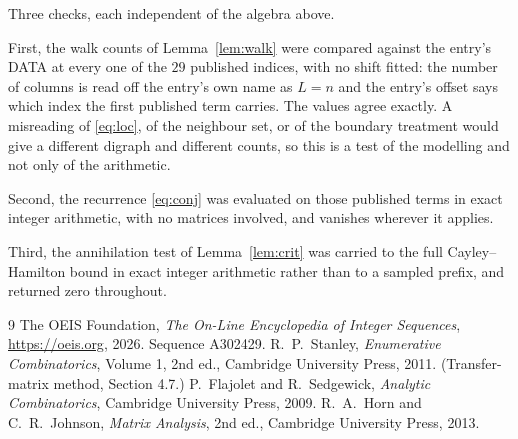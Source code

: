 \documentclass[11pt,a4paper]{article}
\theoremstyle{plain}
\theoremstyle{definition}
\begin{document}
Three checks, each independent of the algebra above.

First, the walk counts of Lemma~\ref{lem:walk} were compared against the entry's DATA at
every one of the $29$ published indices, with no shift fitted: the number of columns is
read off the entry's own name as $L=n$ and the entry's offset says which index the first
published term carries. The values agree exactly. A misreading of \eqref{eq:loc}, of the
neighbour set, or of the boundary treatment would give a different digraph and different
counts, so this is a test of the modelling and not only of the arithmetic.

Second, the recurrence \eqref{eq:conj} was evaluated on those published terms in exact
integer arithmetic, with no matrices involved, and vanishes wherever it applies.

Third, the annihilation test of Lemma~\ref{lem:crit} was carried to the full
Cayley--Hamilton bound in exact integer arithmetic rather than to a sampled prefix, and
returned zero throughout.

\begin{thebibliography}{9}
 The OEIS Foundation, \emph{The On-Line Encyclopedia of Integer
Sequences}, \url{https://oeis.org}, 2026. Sequence A302429.
 R.~P.~Stanley, \emph{Enumerative Combinatorics}, Volume 1, 2nd ed.,
Cambridge University Press, 2011. (Transfer-matrix method, Section 4.7.)
 P.~Flajolet and R.~Sedgewick, \emph{Analytic Combinatorics}, Cambridge
University Press, 2009.
 R.~A.~Horn and C.~R.~Johnson, \emph{Matrix Analysis}, 2nd ed., Cambridge
University Press, 2013.
\end{thebibliography}
\end{document}
